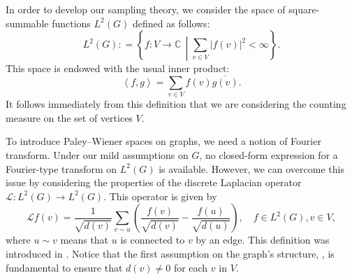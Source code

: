 \documentclass[12pt]{amsart}
\theoremstyle{definition}
\numberwithin{equation}{section}
\theoremstyle{definition}
\theoremstyle{remark}
\numberwithin{equation}{section}
\begin{document}
In order to develop our sampling theory, we consider the space of square-summable functions $L^2(G)$ defined as follows:
$$
L^2(G) : = \left\{f: V \longrightarrow \mathbb{C} \, \middle| \sum_{v \in V}|f(v)|^2 < \infty\right\}.
$$
This space is endowed with the usual inner product:
$$
\left<f,g\right> = \sum_{v \in V}f(v)\overline{g(v)}.
$$
It follows immediately from this definition that we are considering the counting measure on the set of vertices $V$.

To introduce Paley--Wiener spaces on graphs, we need a notion of Fourier transform. Under our mild assumptions on $G$, no closed-form expression for a Fourier-type transform on $L^2(G)$ is available. However, we can overcome this issue by considering the properties of the discrete Laplacian operator $\mathcal{L}: L^2(G) \longrightarrow L^2(G)$. This operator is given by
\begin{equation}
\label{disclap}
  \mathcal{L} f(v)=\frac{1}{\sqrt{d(v)}} \sum_{v \sim u}\left(\frac{f(v)}{\sqrt{d(v)}}-\frac{f(u)}{\sqrt{d(u)}}\right), \quad f \in L^2(G), v\in V,  
\end{equation}
where $u \sim v$ means that $u$ is connected to $v$ by an edge. This definition was introduced in \cite{Chung}. Notice that the first assumption on the graph's structure, , is fundamental to ensure that $d(v) \neq 0$ for each $v$ in $V$.
\end{document}
